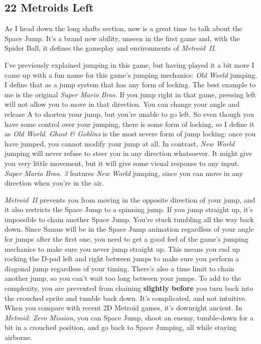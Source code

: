 \documentclass{book}
\begin{document}
\FloatBarrier\subsection*{22 Metroids Left}
As I head down the long shafts section, now is a great time to talk about the Space Jump. It’s a brand new ability, unseen in the first game and, with the Spider Ball, it defines the gameplay and environments of \emph{Metroid~II}.\par
I’ve previously explained jumping in this game, but having played it a bit more I came up with a fun name for this game’s jumping mechanics: \emph{Old World} jumping. I define that as a jump system that has any form of locking. The best example to me is the original \emph{Super Mario Bros.} If you jump right in that game, pressing left will not allow you to move in that direction. You can change your angle and release A to shorten your jump, but you’re unable to go left. So even though you have some control over your jumping, there is some form of locking, so I define it as \emph{Old World}. \emph{Ghost \& Goblins} is the most severe form of jump locking: once you have jumped, you cannot modify your jump at all. In contrast, \emph{New World} jumping will never refuse to steer you in any direction whatsoever. It might give you very little movement, but it will give some visual response to any input. \emph{Super Mario Bros. 3} features \emph{New World} jumping, since you can move in any direction when you’re in the air.\par
\emph{Metroid~II} prevents you from moving in the opposite direction of your jump, and it also restricts the Space Jump to a spinning jump. If you jump straight up, it’s impossible to chain another Space Jump. You’re stuck tumbling all the way back down. Since Samus will be in the Space Jump animation regardless of your angle for jumps after the first one, you need to get a good feel of the game’s jumping mechanics to make sure you never jump straight up. This means you end up rocking the D-pad left and right between jumps to make sure you perform a diagonal jump regardless of your timing. There’s also a time limit to chain another jump, so you can’t wait too long between your jumps. To add to the complexity, you are prevented from chaining \textbf{slightly before} you turn back into the crouched sprite and tumble back down. It’s complicated, and not intuitive. When you compare with recent 2D Metroid games, it’s downright ancient. In \emph{Metroid: Zero Mission}, you can Space Jump, shoot an enemy, tumble-down for a bit in a crouched position, and go back to Space Jumping, all while staying airborne.\par
\end{document}

